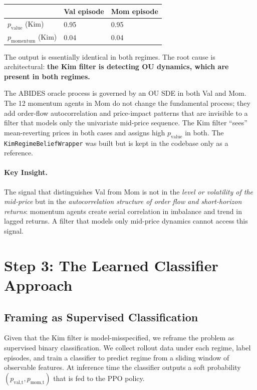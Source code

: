 \documentclass[11pt]{article}
\begin{document}
\begin{center}
\begin{tabular}{lll}
\toprule
 & \textbf{Val episode} & \textbf{Mom episode} \\
\midrule
$p_\text{value}$ (Kim) & 0.95 & 0.95 \\
$p_\text{momentum}$ (Kim) & 0.04 & 0.04 \\
\bottomrule
\end{tabular}
\end{center}

\noindent
The output is essentially identical in both regimes.  The root cause is
architectural: \textbf{the Kim filter is detecting OU dynamics, which are
present in both regimes.}

The ABIDES oracle process is governed by an OU SDE in both Val and Mom.  The
12 momentum agents in Mom do not change the fundamental process; they add
order-flow autocorrelation and price-impact patterns that are invisible to a
filter that models only the univariate mid-price sequence.  The Kim filter
``sees'' mean-reverting prices in both cases and assigns high $p_\text{value}$
in both.  The \texttt{KimRegimeBeliefWrapper} was built but is kept in the
codebase only as a reference.

\paragraph{Key Insight.}
The signal that distinguishes Val from Mom is not in the \emph{level or
volatility of the mid-price} but in the \emph{autocorrelation structure of
order flow and short-horizon returns}: momentum agents create serial
correlation in imbalance and trend in lagged returns.  A filter that models
only mid-price dynamics cannot access this signal.

\section{Step 3: The Learned Classifier Approach}

\subsection{Framing as Supervised Classification}

Given that the Kim filter is model-misspecified, we reframe the problem as
supervised binary classification.  We collect rollout data under each regime,
label episodes, and train a classifier to predict regime from a sliding window
of observable features.  At inference time the classifier outputs a soft
probability $(p_\text{val,t}, p_\text{mom,t})$ that is fed to the PPO policy.
\end{document}
